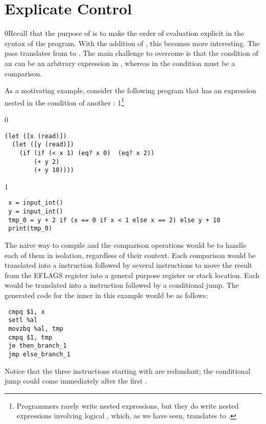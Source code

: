 \documentclass[7x10]{TimesAPriori_MIT}%
\def\racketEd{0}
\def\pythonEd{1}
\def\edition{1}
\newcommand{\racket}[1]{{\if\edition\racketEd{#1}\fi}}
\newcommand{\pythonColor}[0]{}
\newcommand{\python}[1]{{\if\edition\pythonEd\pythonColor #1\fi}}
\numberwithin{theorem}{chapter}
\numberwithin{definition}{chapter}
\numberwithin{equation}{chapter}
\begin{document}
\section{Explicate Control}
\label{sec:explicate-control-Lif}

\racket{Recall that the purpose of  is to
  make the order of evaluation explicit in the syntax of the program.
  With the addition of \key{if}, this becomes more interesting.}
%
The  pass translates from \LangIfANF{} to \LangCIf{}.
%
The main challenge to overcome is that the condition of an 
can be an arbitrary expression in \LangIfANF{}, whereas in \LangCIf{} the
condition must be a comparison.

As a motivating example, consider the following \LangIfANF{} program that has an
 expression nested in the condition of another :%
\python{\footnote{Programmers rarely write nested 
    expressions, but they do write nested expressions involving
    logical \code{and}, which, as we have seen, translates to
    \code{if}.}}
\begin{center}
\begin{minipage}{0.96\textwidth}
{\if\edition\racketEd        
\begin{lstlisting}
(let ([x (read)])
  (let ([y (read)])
    (if (if (< x 1) (eq? x 0)  (eq? x 2))
        (+ y 2)
        (+ y 10))))
\end{lstlisting}
\fi}
{\if\edition\pythonEd\pythonColor
\begin{lstlisting}
 x = input_int()
 y = input_int()
 tmp_0 = y + 2 if (x == 0 if x < 1 else x == 2) else y + 10
 print(tmp_0)
\end{lstlisting}
\fi}
\end{minipage}
\end{center}
%
The naive way to compile  and the comparison operations would
be to handle each of them in isolation, regardless of their context.
Each comparison would be translated into a  instruction
followed by several instructions to move the result from the EFLAGS
register into a general purpose register or stack location. Each
 would be translated into a  instruction followed by
a conditional jump. The generated code for the inner  in this
example would be as follows:
\begin{center}
\begin{minipage}{0.96\textwidth}
\begin{lstlisting}
 cmpq $1, x
 setl %al
 movzbq %al, tmp
 cmpq $1, tmp
 je then_branch_1
 jmp else_branch_1
\end{lstlisting}
\end{minipage}
\end{center}
Notice that the three instructions starting with  are
redundant; the conditional jump could come immediately after the first
. 
\end{document}
